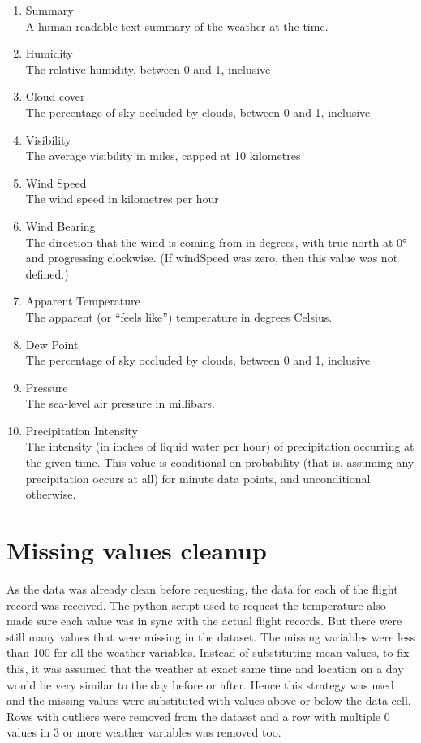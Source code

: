 \begin{enumerate}
    \item Summary
    \\A human-readable text summary of the weather at the time.
    \item Humidity
    \\The relative humidity, between 0 and 1, inclusive
    \item Cloud cover
    \\The percentage of sky occluded by clouds, between 0 and 1, inclusive
    \item Visibility
    \\The average visibility in miles, capped at 10 kilometres
    \item Wind Speed
    \\The wind speed in kilometres per hour
    \item Wind Bearing
    \\The direction that the wind is coming from in degrees, with true north at 0° and progressing clockwise. (If windSpeed was zero, then this value was not defined.)
    \item Apparent Temperature
    \\The apparent (or “feels like”) temperature in degrees Celsius.
    \item Dew Point
    \\The percentage of sky occluded by clouds, between 0 and 1, inclusive
    \item Pressure
    \\The sea-level air pressure in millibars.
    \item Precipitation Intensity
    \\The intensity (in inches of liquid water per hour) of precipitation occurring at the given time. This value is conditional on probability (that is, assuming any precipitation occurs at all) for minute data points, and unconditional otherwise.
\end{enumerate}

\section{Missing values cleanup}
As the data was already clean before requesting, the data for each of the flight record was received. The python script used to request the temperature also made sure each value was in sync with the actual flight records.
But there were still many values that were missing in the dataset. The missing variables were less than 100 for all the weather variables. Instead of substituting mean values, to fix this, it was assumed that the weather at exact same time and location on a day would be very similar to the day before or after. Hence this strategy was used and the missing values were substituted with values above or below the data cell. Rows with outliers were removed from the dataset and a row with multiple 0 values in 3 or more weather variables was removed too.